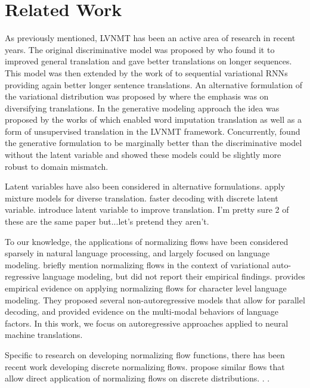 \chapter{Related Work}

As previously mentioned, \ac{LVNMT} has been an active area of research in recent years. The original discriminative model was proposed by \citet{Zhang2016VNMT} who found it to improved general translation and gave better translations on longer sequences. This model was then extended by the work of \citet{Su2018VRNMT} to sequential variational \ac{RNN}s providing again better longer sentence translations. An alternative formulation of the variational distribution was proposed by \citet{schulz2018StochasticDecoder} where the emphasis was on diversifying translations. In the generative modeling approach the idea was proposed by the works of \citet{harshil2018GNMT} which enabled word imputation translation as well as a form of unsupervised translation in the \ac{LVNMT} framework. Concurrently, \citet{eikema2018AEVNMT} found the generative formulation to be marginally better than the discriminative model without the latent variable and showed these models could be slightly more robust to domain mismatch. 

Latent variables have also been considered in alternative formulations. \citet{shen2019mixturemodelsfordiverseMT} apply mixture models for diverse translation. \citet{kaiser2018DiscreteLatentVariables} faster decoding with discrete latent variable. \citet{he2018seq2seqmixturemodelforDiverseMachineTranslation} introduce latent variable to improve translation. I'm pretty sure 2 of these are the same paper but...let's pretend they aren't. 

To our knowledge, the applications of normalizing flows have been considered sparsely in natural language processing, and largely focused on language modeling. \citet{bowman2015GeneratingSent} briefly mention normalizing flows in the context of variational auto-regressive language modeling, but did not report their empirical findings. \citet{ziegler2019LatentNFforDiscrete} provides empirical evidence on applying normalizing flows for character level language modeling. They proposed several non-autoregressive models that allow for parallel decoding, and provided evidence on the multi-modal behaviors of language factors. In this work, we focus on autoregressive approaches applied to neural machine translations.

Specific to research on developing normalizing flow functions, there has been recent work developing discrete normalizing flows. \cite{tran2019discreteflows,hoogeboom2019IntegerDiscreteFlows} propose similar flows that allow direct application of normalizing flows on discrete distributions. . .
